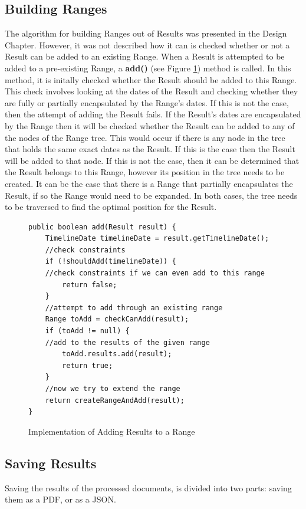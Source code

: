 \subsection{Building Ranges}
\par The algorithm for building Ranges out of Results was presented in the Design Chapter. However, it was not described how it can is checked whether or not a Result can be added to an existing Range. When a Result is attempted to be added to a pre-existing Range, a \textbf{add()} (see Figure \ref{fig:addRangeImplementation}) method is called. In this method, it is initally checked whether the Result should be added to this Range. This check involves looking at the dates of the Result and checking whether they are fully or partially encapsulated by the Range's dates. If this is not the case, then the attempt of adding the Result fails. If the Result's dates are encapsulated by the Range then it will be checked whether the Result can be added to any of the nodes of the Range tree. This would occur if there is any node in the tree that holds the same exact dates as the Result. If this is the case then the Result will be added to that node. If this is not the case, then it can be determined that the Result belongs to this Range, however its position in the tree needs to be created. It can be the case that there is a Range that partially encapsulates the Result, if so the Range would need to be expanded. In both cases, the tree needs to be traversed to find the optimal position for the Result.

\begin{figure}[H]
\begin{lstlisting}
public boolean add(Result result) {
    TimelineDate timelineDate = result.getTimelineDate();
    //check constraints
    if (!shouldAdd(timelineDate)) {
	//check constraints if we can even add to this range
        return false;
    }
    //attempt to add through an existing range
    Range toAdd = checkCanAdd(result);
    if (toAdd != null) {
	//add to the results of the given range
        toAdd.results.add(result);
        return true;
    }
    //now we try to extend the range
    return createRangeAndAdd(result);
}
\end{lstlisting}
\caption{Implementation of Adding Results to a Range}
\label{fig:addRangeImplementation}
\end{figure}

\subsection{Saving Results}
\par Saving the results of the processed documents, is divided into two parts: saving them as a PDF, or as a JSON. 

